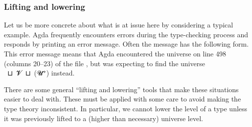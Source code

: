 \subsubsection{Lifting and lowering}\label{lifting-and-lowering}
Let us be more concrete about what is at issue here by considering a typical example. Agda frequently encounters errors during the type-checking process and responds by printing an error message. Often the message has the following form.
{\color{red}{\small
\begin{verbatim}
  Birkhoff.lagda:498,20-23
  𝓤 != 𝓞 ⊔ 𝓥 ⊔ (𝓤 ⁺) when checking that... has type...
\end{verbatim}}}
\noindent This error message means that Agda encountered the universe  on line 498 (columns 20--23) of the file , but was expecting to find the universe ~\aop ⊔~\ab 𝓥~\aop ⊔~(\ab 𝓤\af ⁺) instead.

There are some general ``lifting and lowering'' tools that make these situations easier to deal with. These must be applied with some care to avoid making the type theory inconsistent. In particular, we cannot lower the level of a type unless it was previously lifted to a (higher than necessary) universe level.

